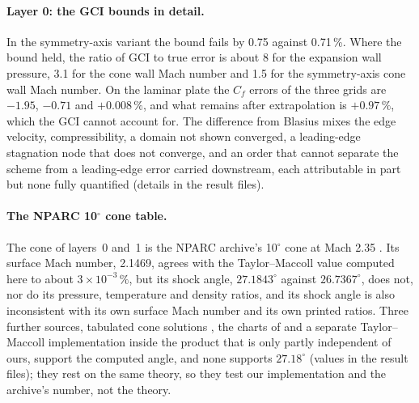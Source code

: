 \documentclass[twocolumn]{labreport}
\begin{document}
\paragraph{Layer 0: the GCI bounds in detail.}
In the symmetry-axis variant the bound fails by 0.75 against 0.71\,\%.
Where the bound held, the ratio of GCI to true error is about 8 for the expansion wall pressure, 3.1 for the cone wall Mach number and 1.5 for the symmetry-axis cone wall Mach number.
On the laminar plate the $C_f$ errors of the three grids are $-1.95$, $-0.71$ and $+0.008\,\%$, and what remains after extrapolation is $+0.97\,\%$, which the GCI cannot account for.
The difference from Blasius mixes the edge velocity, compressibility, a domain not shown converged, a leading-edge stagnation node that does not converge, and an order that cannot separate the scheme from a leading-edge error carried downstream, each attributable in part but none fully quantified (details in the result files).

\paragraph{The NPARC 10$^\circ$ cone table.}
\label{sec:cone10}
The cone of layers~0 and~1 is the NPARC archive's 10$^\circ$ cone at Mach 2.35 \citep{nparc_cone10}.
Its surface Mach number, 2.1469, agrees with the Taylor--Maccoll value computed here to about $3\times10^{-3}\,\%$, but its shock angle, $27.1843^\circ$ against $26.7367^\circ$, does not, nor do its pressure, temperature and density ratios, and its shock angle is also inconsistent with its own surface Mach number and its own printed ratios.
Three further sources, tabulated cone solutions \citep{sims1964}, the charts of \citet{ames1953} and a separate Taylor--Maccoll implementation inside the product that is only partly independent of ours, support the computed angle, and none supports $27.18^\circ$ (values in the result files); they rest on the same theory, so they test our implementation and the archive's number, not the theory.
\end{document}

